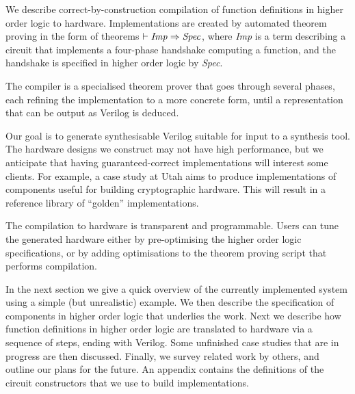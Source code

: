 
We describe correct-by-construction compilation of
function definitions in higher order logic to hardware.  
Implementations are created by automated theorem proving in the form of theorems $\vdash
{\it{Imp}}\Rightarrow{\it{Spec}}$, where {\it{Imp}} is a term
describing a circuit that implements a four-phase handshake computing
a function, and the handshake is specified in higher order logic by
{\it{Spec}}.

The compiler is a specialised theorem prover
that goes through several phases, each refining the
implementation to a more concrete form, until a representation that
can be output as Verilog is deduced.


Our goal is to generate synthesisable Verilog suitable for input to a
synthesis tool. The hardware designs we construct may not have high
performance, but we anticipate that having
guaranteed-correct implementations will interest some clients. For
example, a case study at Utah aims to produce implementations of
components useful for building cryptographic hardware.  This will
result in a reference library of ``golden'' implementations. 

The compilation to hardware is transparent and programmable. Users can
tune the generated hardware either by pre-optimising the higher order
logic specifications, or by adding optimisations to the theorem
proving script that performs compilation.


In the next section we give a quick overview of the currently
implemented system using a simple (but unrealistic) example. We then
describe the specification of components in higher order logic that
underlies the work. Next we describe how function definitions in
higher order logic are translated to hardware via a sequence of steps,
ending with Verilog.  Some unfinished case studies that are in
progress are then discussed. Finally, we survey related work by
others, and outline our plans for the future. An appendix contains the
definitions of the circuit constructors that we use to build
implementations.
